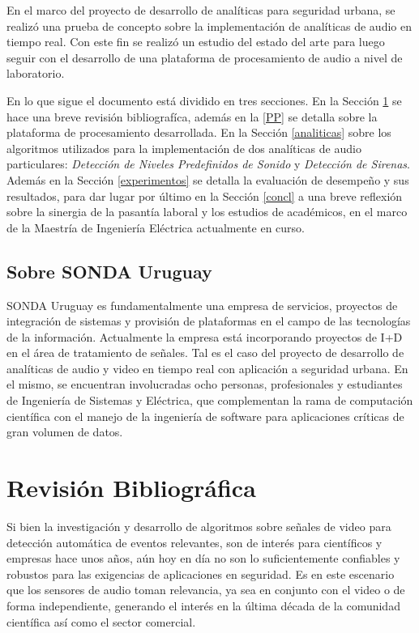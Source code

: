 \documentclass{article}
\begin{document}
\bigskip
En el marco del proyecto de desarrollo de analíticas para seguridad urbana, se realizó una prueba de concepto sobre la implementación de analíticas de audio en tiempo real. Con este fin se realizó un estudio del estado del arte para luego seguir con el desarrollo de una plataforma de procesamiento de audio a nivel de laboratorio. 

\bigskip
En lo que sigue el documento está dividido en tres secciones. En la Sección \ref{literatura} se hace una breve revisión bibliografíca, además en la \ref{PP} se detalla sobre la plataforma de procesamiento desarrollada. En la Sección \ref{analiticas} sobre los algoritmos utilizados para la implementación de dos analíticas de audio particulares: \textit{Detección de Niveles Predefinidos de Sonido} y \textit{Detección de Sirenas}. Además en la Sección \ref{experimentos} se detalla la evaluación de desempeño y sus resultados, para dar lugar por último en la Sección \ref{concl} a una breve reflexión sobre la sinergia de la pasantía laboral y los estudios de académicos, en el marco de la Maestría de Ingeniería Eléctrica actualmente en curso.  

\subsection{Sobre SONDA Uruguay}
SONDA Uruguay es fundamentalmente una empresa de servicios, proyectos de integración de sistemas y provisión de plataformas en el campo de las tecnologías de la información. Actualmente la empresa está incorporando proyectos de I+D en el área de tratamiento de señales. Tal es el caso del proyecto de desarrollo de analíticas de audio y video en tiempo real con aplicación a seguridad urbana. En el mismo, se encuentran involucradas ocho personas, profesionales y estudiantes de Ingeniería de Sistemas y Eléctrica, que complementan la rama de computación científica con el manejo de la ingeniería de software para aplicaciones críticas de gran volumen de datos.  


\section{Revisión Bibliográfica}
\label{literatura}
Si bien la investigación y desarrollo de algoritmos sobre señales de video para detección automática de eventos relevantes, son de interés para científicos y empresas hace unos años, aún hoy en día no son lo suficientemente confiables y robustos para las exigencias de aplicaciones en seguridad. Es en este escenario que los sensores de audio toman relevancia, ya sea en conjunto con el video o de forma independiente, generando el interés en la última década de la comunidad científica así como el sector comercial. 
\end{document}
